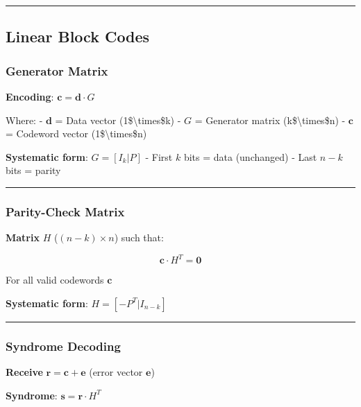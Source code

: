 \begin{center}\rule{0.5\linewidth}{0.5pt}\end{center}

\subsection{Linear Block Codes}\label{linear-block-codes}

\subsubsection{Generator Matrix}\label{generator-matrix}

\textbf{Encoding}: \(\mathbf{c} = \mathbf{d} \cdot G\)

Where: - \(\mathbf{d}\) = Data vector (1\$\textbackslash times\$k) -
\(G\) = Generator matrix (k\$\textbackslash times\$n) - \(\mathbf{c}\) =
Codeword vector (1\$\textbackslash times\$n)

\textbf{Systematic form}: \(G = [I_k | P]\) - First \(k\) bits = data
(unchanged) - Last \(n-k\) bits = parity

\begin{center}\rule{0.5\linewidth}{0.5pt}\end{center}

\subsubsection{Parity-Check Matrix}\label{parity-check-matrix}

\textbf{Matrix} \(H\) (\((n-k) \times n\)) such that:

\[
\mathbf{c} \cdot H^T = \mathbf{0}
\]

For all valid codewords \(\mathbf{c}\)

\textbf{Systematic form}: \(H = [-P^T | I_{n-k}]\)

\begin{center}\rule{0.5\linewidth}{0.5pt}\end{center}

\subsubsection{Syndrome Decoding}\label{syndrome-decoding}

\textbf{Receive} \(\mathbf{r} = \mathbf{c} + \mathbf{e}\) (error vector
\(\mathbf{e}\))

\textbf{Syndrome}: \(\mathbf{s} = \mathbf{r} \cdot H^T\)

